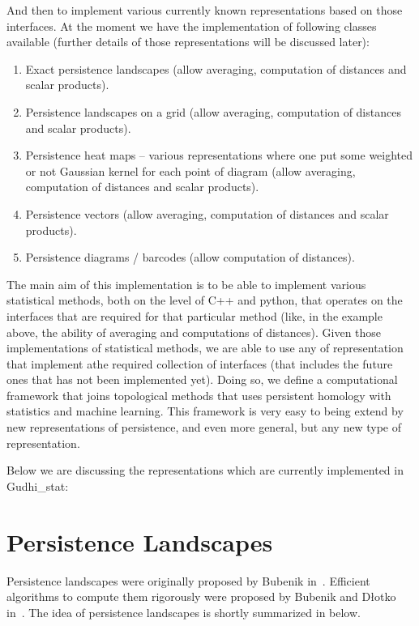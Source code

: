\documentclass[11pt]{article}
\begin{document}
And then to implement various currently known representations based on those interfaces. At the moment we have the implementation of following classes available (further details of those representations will be discussed later):
\begin{enumerate}
\item Exact persistence landscapes (allow averaging, computation of distances and scalar products).
\item Persistence landscapes on a grid (allow averaging, computation of distances and scalar products).
\item Persistence heat maps – various representations where one put some weighted or not Gaussian kernel for each point of diagram (allow averaging, computation of distances and scalar products).
\item Persistence vectors (allow averaging, computation of distances and scalar products).
\item Persistence diagrams / barcodes (allow computation of distances).
\end{enumerate}


The main aim of this implementation is to be able to implement various statistical methods, both on the level of C++ and python, that operates on the interfaces that are required for that particular method (like, in the example above, the ability of averaging and computations of distances). Given those implementations of statistical methods, we are able to use any of representation that implement athe required collection of interfaces (that includes the future ones that has not been implemented yet). 
Doing so, we define a computational framework that joins topological methods that uses persistent homology with statistics and machine learning. This framework is very easy to being extend by new representations of persistence, and even more general, but any new type of representation.

Below we are discussing the representations which are currently implemented in Gudhi\_stat:


\section{Persistence Landscapes}
\label{sec:persistence_landscapes}
Persistence landscapes were originally proposed by Bubenik in~\cite{landscapes1}. Efficient algorithms to compute them rigorously were proposed by Bubenik and D{\l}otko in~\cite{landscapes2}. The idea of persistence landscapes is shortly summarized in below.
\end{document}
